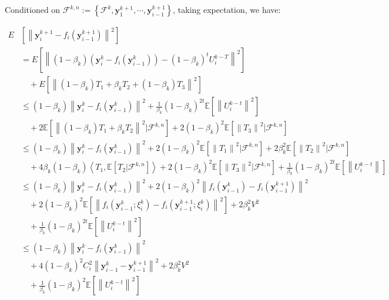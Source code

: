 Conditioned on $\mathcal{F}^{k,n}:=\left \{ \mathcal{F}^k,\boldsymbol{y}_1^{k+1},\cdots,\boldsymbol{y}_{i-1}^{k+1} \right \}$, taking expectation, we have:

\begin{equation*}
\begin{split}
E&\left [ \left \| \boldsymbol{y}_i^{k+1}-f_i\left ( \boldsymbol{y}_{i-1}^{k+1} \right )\right \|^2 \right ]\\
&=E\left [ \left \| \left ( 1-\beta_k \right )\left ( \boldsymbol{y}_i^k-f_i\left ( \boldsymbol{y}_{i-1}^k \right ) \right )-\left ( 1-\beta_k \right )^tU_i^{k-T} \right \|^2 \right ]\\
&\quad+E\left [ \left \| \left ( 1-\beta_k \right )T_1+\beta_kT_2+\left ( 1-\beta_k \right )T_3 \right \|^2 \right ]\\
&\leq\left ( 1-\beta_k \right )\left \| \boldsymbol{y}_i^k-f_i\left ( \boldsymbol{y}_{i-1}^k \right ) \right \|^2+\frac{1}{\beta_k}\left ( 1-\beta_k \right )^{2t}\mathbb{E}\left [ \left \| U_i^{k-t} \right \|^2 \right ]\\
&\quad+2\mathbb{E}\left [ \left \| \left ( 1-\beta_k \right )T_1+\beta_kT_2 \right \|^2|\mathcal{F}^{k,n} \right ]+2\left ( 1-\beta_k \right )^2\mathbb{E}\left [ \left \| T_3 \right \|^2|\mathcal{F}^{k,n} \right ]\\
&\leq\left ( 1-\beta_k \right )\left \| \boldsymbol{y}_i^k-f_i\left ( \boldsymbol{y}_{i-1}^k \right ) \right \|^2+2\left ( 1-\beta_k \right )^2\mathbb{E}\left [ \left \| T_1 \right \|^2|\mathcal{F}^{k,n} \right ]+2\beta_k^2\mathbb{E}\left [ \left \| T_2 \right \|^2|\mathcal{F}^{k,n} \right ]\\
&\quad+4\beta_k\left ( 1-\beta_k \right )\left \langle T_1,\mathbb{E}\left [ T_2|\mathcal{F}^{k,n} \right ] \right \rangle+2\left ( 1-\beta_k \right )^2\mathbb{E}\left [ \left \| T_3 \right \|^2|\mathcal{F}^{k,n} \right ]+\frac{1}{\beta_k}\left ( 1-\beta_k \right )^{2t}\mathbb{E}\left [ \left \| U_i^{k-t} \right \| \right ]\\
&\leq\left ( 1-\beta_k \right )\left \| \boldsymbol{y}_i^k-f_i\left ( \boldsymbol{y}_{i-1}^k \right ) \right \|^2+2\left ( 1-\beta_k \right )^2\left \| f_i\left ( \boldsymbol{y}_{i-1}^k \right )-f_i\left ( \boldsymbol{y}_{i-1}^{k+1} \right ) \right \|^2\\
&\quad+2\left ( 1-\beta_k \right )^2\mathbb{E}\left [ \left \| f_i\left ( \boldsymbol{y}_{i-1}^k;\xi_i^k \right )-f_i\left ( \boldsymbol{y}_{i-1}^{k+1};\xi_i^k \right ) \right \|^2 \right ]+2\beta_k^2V^2\\
&\quad+\frac{1}{\beta_k}\left ( 1-\beta_k \right )^{2t}\mathbb{E}\left [ \left \| U_i^{k-t} \right \|^2 \right ]\\
&\leq\left ( 1-\beta_k \right )\left \| \boldsymbol{y}_i^k-f_i\left ( \boldsymbol{y}_{i-1}^k \right ) \right \|^2\\
&\quad+4\left ( 1-\beta_k \right )^2C_i^2\left \| \boldsymbol{y}_{i-1}^k-\boldsymbol{y}_{i-1}^{k+1} \right \|^2+2\beta_k^2V^2\\
&\quad+\frac{1}{\beta_k}\left( 1-\beta_k \right )^2\mathbb{E}\left [ \left \| U_i^{k-t} \right \|^2 \right ]
\end{split}
\end{equation*}

